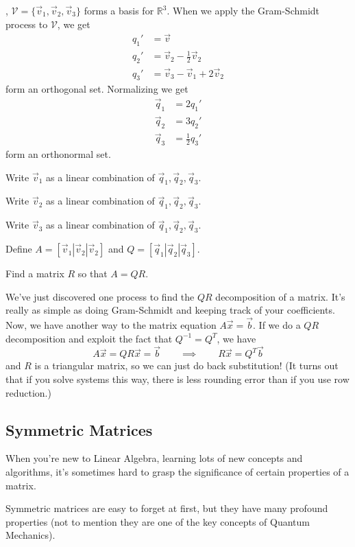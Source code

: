 \documentclass[letter]{article}
\newcommand{\R}{\mathbb{R}}
\begin{document}
	\sep
	$\mathcal V=\{\vec v_1,\vec v_2,\vec v_3\}$ forms a basis for $\R^3$.
	When we apply the Gram-Schmidt process to $\mathcal V$, we get
	\[
		\begin{array}{rl}
			q_1' &=\vec v\\
			q_2' &= \vec v_2-\frac{1}{2}\vec v_2\\
			q_3' &= \vec v_3-\vec v_1+2\vec v_2
		\end{array}
	\]
	form an orthogonal set.  Normalizing we get
	\[
		\begin{array}{rl}
			\vec q_1 &= 2q_1'\\
			\vec q_2 &= 3q_2'\\
			\vec q_3 &=\frac{1}{2}q_3'
		\end{array}
	\]
	form an orthonormal set.
	\begin{Enum}
		\item Write $\vec v_1$ as a linear combination of $\vec q_1,\vec q_2,\vec q_3$.
		\item Write $\vec v_2$ as a linear combination of $\vec q_1,\vec q_2,\vec q_3$.
		\item Write $\vec v_3$ as a linear combination of $\vec q_1,\vec q_2,\vec q_3$.
	\end{Enum}
	Define $A=[\vec v_1|\vec v_2|\vec v_2]$ and $Q=[\vec q_1|\vec q_2|\vec q_3]$.
	\begin{Enum}[resume]
		\item Find a matrix $R$ so that $A=QR$.
	\end{Enum}
	
	We've just discovered one process to find the $QR$ decomposition of a matrix.
	It's really as simple as doing Gram-Schmidt and keeping track of your coefficients.
	Now, we have another way to the matrix equation $A\vec x=\vec b$.  If we do a $QR$
	decomposition and exploit the fact that $Q^{-1}=Q^T$, we have
	\[
		A\vec x=QR\vec x=\vec b\qquad\implies\qquad R\vec x=Q^T\vec b
	\]
	and $R$ is a triangular matrix, so we can just do back substitution! (It turns
	out that if you solve systems this way, there is less rounding error than if you
	use row reduction.)

\subsection*{Symmetric Matrices}
	When you're new to Linear Algebra, learning lots of new concepts and algorithms,
	it's sometimes hard to grasp the significance of certain properties of a matrix.

	Symmetric matrices are easy to forget at first, but they have many profound 
	properties (not to mention they are one of the key concepts of Quantum Mechanics).
\end{document}
